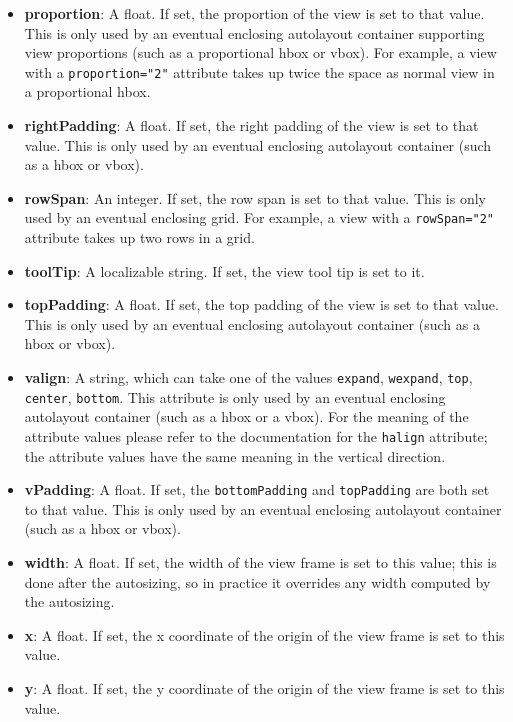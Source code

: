 \begin{itemize}
\item {\bf proportion}: A float.  If set, the proportion of the view
  is set to that value.  This is only used by an eventual enclosing
  autolayout container supporting view proportions (such as a
  proportional hbox or vbox).  For example, a view with a
  \texttt{proportion="2"} attribute takes up twice the space as normal
  view in a proportional hbox.
\item {\bf rightPadding}: A float.  If set, the right padding of the
  view is set to that value.  This is only used by an eventual
  enclosing autolayout container (such as a hbox or vbox).
\item {\bf rowSpan}: An integer.  If set, the row span is set to
  that value.  This is only used by an eventual enclosing grid.  For
  example, a view with a \texttt{rowSpan="2"} attribute takes up
  two rows in a grid.
\item {\bf toolTip}: A localizable string.  If set, the view tool tip
  is set to it.
\item {\bf topPadding}: A float.  If set, the top padding of the view
  is set to that value.  This is only used by an eventual enclosing
  autolayout container (such as a hbox or vbox).
\item {\bf valign}: A string, which can take one of the values
  \texttt{expand}, \texttt{wexpand}, \texttt{top}, \texttt{center},
  \texttt{bottom}.  This attribute is only used by an eventual
  enclosing autolayout container (such as a hbox or a vbox).  For the
  meaning of the attribute values please refer to the documentation
  for the \texttt{halign} attribute; the attribute values have the
  same meaning in the vertical direction.
\item {\bf vPadding}: A float.  If set, the \texttt{bottomPadding} and
  \texttt{topPadding} are both set to that value.  This is only used
  by an eventual enclosing autolayout container (such as a hbox or
  vbox).
\item {\bf width}: A float.  If set, the width of the view frame is
  set to this value; this is done after the autosizing, so in practice
  it overrides any width computed by the autosizing.
\item {\bf x}: A float.  If set, the x coordinate of the origin of the
  view frame is set to this value.
\item {\bf y}: A float.  If set, the y coordinate of the origin of the
  view frame is set to this value.
\end{itemize}

